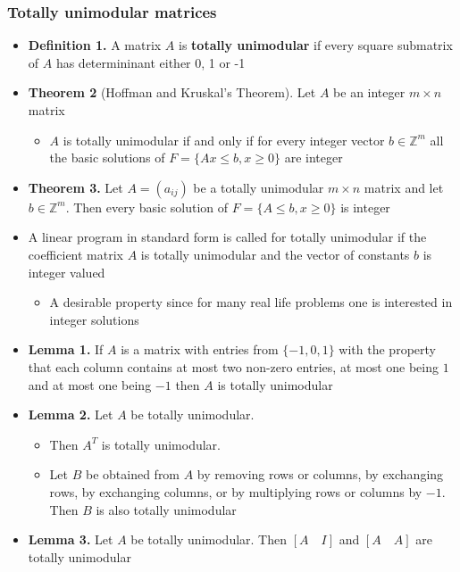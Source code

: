 \documentclass[11pt]{article}
\begin{document}
\subsubsection{Totally unimodular matrices}
\label{sec:orgfba151b}
\begin{itemize}
\item \textbf{Definition 1.} A matrix \(A\) is \textbf{totally unimodular} if every square submatrix of \(A\) has determininant either 0, 1 or -1
\item \textbf{Theorem 2} (Hoffman and Kruskal's Theorem). Let \(A\) be an integer \(m \times n\) matrix
\begin{itemize}
\item \(A\) is totally unimodular if and only if for every integer vector \(b \in \mathbb Z^m\) all the basic solutions of \(F = \{ Ax \leq b, x \geq 0\}\) are integer
\end{itemize}
\item \textbf{Theorem 3.} Let \(A= (a_{ij})\) be a totally unimodular \(m \times n\) matrix and let \(b \in \mathbb Z^m\). Then every basic solution of \(F = \{A \leq b, x \geq 0\}\) is integer
\item A linear program in standard form is called for totally unimodular if the coefficient matrix \(A\) is totally unimodular and the vector of constants \(b\) is integer valued
\begin{itemize}
\item A desirable property since for many real life problems one is interested in integer solutions
\end{itemize}

\item \textbf{Lemma 1.} If \(A\) is a matrix with entries from \(\{-1,0,1\}\) with the property that each column contains at most two non-zero entries, at most one being \(1\) and at most one being \(-1\) then \(A\) is totally unimodular
\item \textbf{Lemma 2.} Let \(A\) be totally unimodular.
\begin{itemize}
\item Then \(A^T\) is totally unimodular.
\item Let \(B\) be obtained from \(A\) by removing rows or columns, by exchanging rows, by exchanging columns, or by multiplying rows or columns by \(-1\). Then \(B\) is also totally unimodular
\end{itemize}
\item \textbf{Lemma 3.} Let \(A\) be totally unimodular. Then \([A \quad I]\) and \([A \quad A]\) are totally unimodular
\end{itemize}
\end{document}
